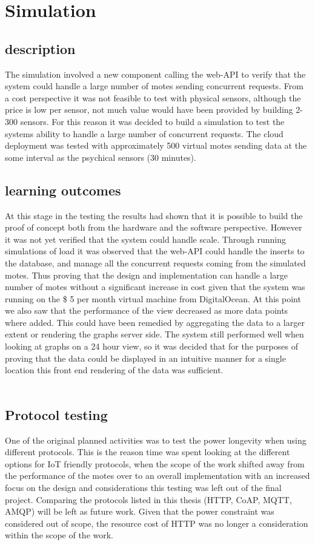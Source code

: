\documentclass[]{uiophd}
\begin{document}
\section{Simulation}
\subsection{description}
The simulation involved a new component calling the web-API to verify that the system could handle a large number of motes sending concurrent requests. From a cost perspective it was not feasible to test with physical sensors, although the price is low per sensor, not much value would have been provided by building 2-300 sensors. For this reason it was decided to build a simulation to test the systems ability to handle a large number of concurrent requests. The cloud deployment was tested with approximately 500 virtual motes sending data at the some interval as the psychical sensors (30 minutes). 
\subsection{learning outcomes}
At this stage in the testing the results had shown that it is possible to build the proof of concept both from the hardware and the software perspective. However it was not yet verified that the system could handle scale. Through running simulations of load it was observed that the web-API could handle the inserts to the database, and manage all the concurrent requests coming from the simulated motes. Thus proving that the design and implementation can handle a large number of motes without a significant increase in cost given that the system was running on the \$ 5 per month virtual machine from DigitalOcean. At this point we also saw that the performance of the view decreased as more data points where added. This could have been remedied by aggregating the data to a larger extent or rendering the graphs server side. The system still performed well when looking at graphs on a 24 hour view, so it was decided that for the purposes of proving that the data could be displayed in an intuitive manner for a single location this front end rendering of the data was sufficient.
\\\\
\subsection{Protocol testing}
One of the original planned activities was to test the power longevity when using different protocols. This is the reason time was spent looking at the different options for IoT friendly protocols, when the scope of the work shifted away from the performance of the motes over to an overall implementation with an increased focus on the design and considerations this testing was left out of the final project. Comparing the protocols listed in this thesis (HTTP, CoAP, MQTT, AMQP) will be left as future work. Given that the power constraint was considered out of scope, the resource cost of HTTP was no longer a consideration within the scope of the work.
\end{document}
